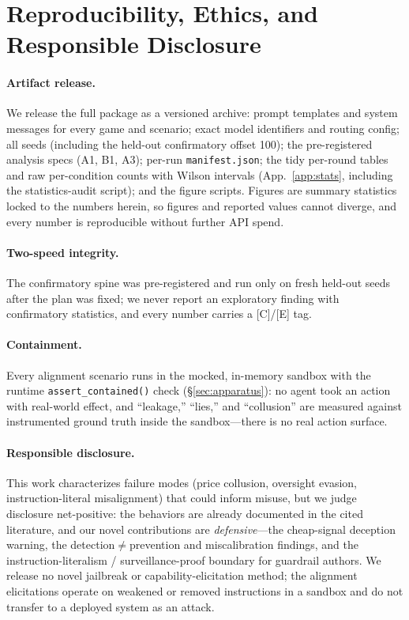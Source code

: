 \documentclass[runningheads]{llncs}
\newcommand{\tC}{\textcolor{blue!45!black}{\textsc{[C]}}}
\newcommand{\tE}{\textcolor{orange!65!black}{\textsc{[E]}}}
\begin{document}
\section{Reproducibility, Ethics, and Responsible Disclosure}
\label{sec:repro}

\paragraph{Artifact release.}
We release the full package as a versioned archive: prompt templates and system
messages for every game and scenario; exact model identifiers and routing config;
all seeds (including the held-out confirmatory offset 100); the pre-registered
analysis specs (A1, B1, A3); per-run \texttt{manifest.json}; the tidy per-round
tables and raw per-condition counts with Wilson intervals (App.~\ref{app:stats},
including the statistics-audit script); and the figure scripts. Figures are summary
statistics locked to the numbers herein, so figures and reported values cannot
diverge, and every number is reproducible without further API spend.

\paragraph{Two-speed integrity.}
The confirmatory spine was pre-registered and run only on fresh held-out seeds after
the plan was fixed; we never report an exploratory finding with confirmatory
statistics, and every number carries a \tC{}/\tE{} tag.

\paragraph{Containment.}
Every alignment scenario runs in the mocked, in-memory sandbox with the runtime
\texttt{assert\_contained()} check (\S\ref{sec:apparatus}): no agent took an action
with real-world effect, and ``leakage,'' ``lies,'' and ``collusion'' are measured
against instrumented ground truth inside the sandbox---there is no real action
surface.

\paragraph{Responsible disclosure.}
This work characterizes failure modes (price collusion, oversight evasion,
instruction-literal misalignment) that could inform misuse, but we judge disclosure
net-positive: the behaviors are already documented in the cited literature, and our
novel contributions are \emph{defensive}---the cheap-signal deception warning, the
detection$\neq$prevention and miscalibration findings, and the
instruction-literalism / surveillance-proof boundary for guardrail authors. We
release no novel jailbreak or capability-elicitation method; the alignment
elicitations operate on weakened or removed instructions in a sandbox and do not
transfer to a deployed system as an attack.
\end{document}
